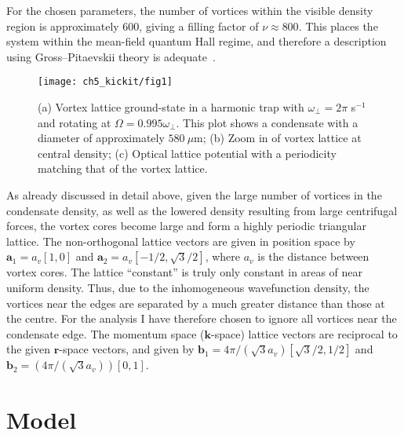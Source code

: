 For the chosen parameters, the number of vortices within the visible density region is approximately 600, giving a filling factor of $\nu \approx 800 $. This places the system within the mean-field quantum Hall regime, and therefore a description using Gross--Pitaevskii theory is adequate~\cite{Vtx:Schweikhard_prl_2004}.

\begin{figure}
    \centering
    \texttt{[image: ch5\_kickit/fig1]}
    \caption[Comparison of vortex lattice and optical lattice structures.]{(a) Vortex lattice ground-state in a harmonic trap with $\omega_\perp=2\pi$ s$^{-1}$ and rotating at $\Omega=0.995\omega_\perp$. This plot shows a condensate with a diameter of approximately $580~\mu\textrm{m}$; (b) Zoom in of vortex lattice at central density; (c) Optical lattice potential with a periodicity matching that of the vortex lattice.}
    \label{fig:vlatt_gnd}
\end{figure}
\fi

As already discussed in detail above, given the large number of vortices in the condensate density, as well as the lowered density resulting from large centrifugal forces, the vortex cores become large and form a highly periodic triangular lattice. The non-orthogonal lattice vectors are given in position space by $\mathbf{a}_1 = a_v[1,0]$ and $\mathbf{a}_2 = a_v[-1/2, \sqrt{3}/2]$, where $a_v$ is the distance between vortex cores. The lattice ``constant'' is truly only constant in areas of near uniform density. Thus, due to the inhomogeneous wavefunction density, the vortices near the edges are separated by a much greater distance than those at the centre. For the analysis I have therefore chosen to ignore all vortices near the condensate edge. The momentum space ($\mathbf{k}$-space) lattice vectors are reciprocal to the given $\mathbf{r}$-space vectors, and given by $\mathbf{b}_1 = 4\pi/(\sqrt{3}a_v)[\sqrt{3}/2,1/2]$ and $\mathbf{b}_2 = (4\pi/(\sqrt{3}a_v))[0,1]$.


\section{Model}

